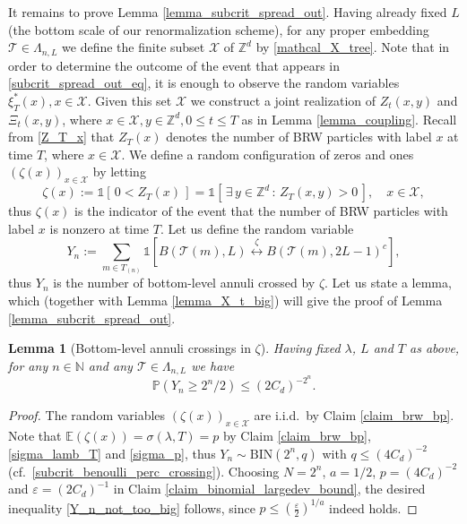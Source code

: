 \documentclass[a4paper,12pt]{article}
\newtheorem  {lemma}         [theorem]{Lemma}
\begin{document}
It remains to prove Lemma  \ref{lemma_subcrit_spread_out}.
Having already fixed $L$ (the bottom scale of our renormalization scheme), for any proper embedding $\mathcal{T} \in \Lambda_{n,L}$
we define the finite subset $\mathcal{X}$ of $\mathbb{Z}^d$ by \eqref{mathcal_X_tree}.
Note that in order to determine the outcome of the event that appears in \eqref{subcrit_spread_out_eq}, it is enough to observe the random variables $\xi^*_T(x), x \in \mathcal{X}$. Given this set $\mathcal{X}$ we construct a joint realization of  $Z_t(x,y)$ and $\Xi_t(x,y)$, where $x \in \mathcal{X}, y \in \mathbb{Z}^d, 0 \leq t \leq T$ as in Lemma  \ref{lemma_coupling}.
Recall from \eqref{Z_T_x} that $Z_T(x)$ denotes the number of BRW particles with label $x$ at time $T$, where $x \in \mathcal{X}$. We define a random configuration of zeros and ones $\left(\zeta(x)\right)_{x \in \mathcal{X}}$  by letting
\begin{equation}\label{zeta_def}
  \zeta(x):= \mathds{1}\left[ \, 0<  Z_T(x)  \, \right]= \mathds{1}\left[ \, \exists \, y \in \mathbb{Z}^d \, : \, Z_T(x,y) >0    \, \right], \quad x \in \mathcal{X},
\end{equation}
thus $\zeta(x)$ is the indicator of the event that the number of BRW particles with label $x$ is nonzero at time $T$.
Let us define the random variable
\begin{equation}\label{def_Y_n}
  Y_n:= \sum_{m \in T_{(n)} }  \mathds{1}\left[  B(\mathcal{T}(m),  L ) \stackrel{ \zeta }{\longleftrightarrow}  B(\mathcal{T}(m), 2L-1)^c  \right],
\end{equation}
thus $Y_n$ is the number of bottom-level annuli crossed by $\zeta$.
Let us state a lemma, which (together with Lemma \ref{lemma_X_t_big}) will give the proof of Lemma  \ref{lemma_subcrit_spread_out}.

\begin{lemma}[Bottom-level annuli crossings in $\zeta$]\label{lemma_Y_n_not_too_big} Having fixed $\lambda$, $L$ and $T$ as above, for any $n \in \mathbb{N}$ and any $\mathcal{T} \in \Lambda_{n,L}$ we have
  \begin{equation}\label{Y_n_not_too_big}
    \mathbb{P}\left( Y_n \geq  2^n /2 \right) \leq \left( 2 C_d  \right)^{-2^n}.
  \end{equation}
\end{lemma}
\begin{proof}
  The random variables $\left(\zeta(x)\right)_{x \in \mathcal{X}}$ are i.i.d.\ by Claim \ref{claim_brw_bp}.
Note that $\mathbb{E}( \zeta(x)) = \sigma(\lambda,T) = p$ by Claim \ref{claim_brw_bp}, \eqref{sigma_lamb_T} and \eqref{sigma_p}, thus
$Y_n \sim \mathrm{BIN}(2^n, q)$ with $q \leq (4 C_d)^{-2}$ (cf.\ \eqref{subcrit_benoulli_perc_crossing}).
 Choosing $N=2^n$, $a=1/2$, $p=(4 C_d)^{-2}$ and $\varepsilon=\left( 2 C_d  \right)^{-1}$ in Claim \ref{claim_binomial_largedev_bound}, the desired inequality  \eqref{Y_n_not_too_big}  follows, since $p \leq \left( \frac{\varepsilon}{2} \right)^{1/a}$ indeed holds.
\end{proof}
\end{document}
